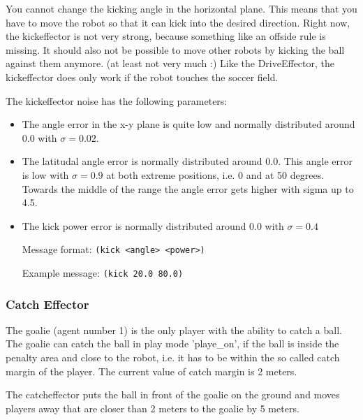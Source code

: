 You cannot change the kicking angle in the horizontal plane. This
means that you have to move the robot so that it can kick into the
desired direction. Right now, the kickeffector is not very strong,
because something like an offside rule is missing. It should also not
be possible to move other robots by kicking the ball against them
anymore. (at least not very much :) Like the DriveEffector, the
kickeffector does only work if the robot touches the soccer field.

The kickeffector noise has the following parameters: 
\begin{itemize}
\item The angle error in the x-y plane is quite low and normally distributed
around $0.0$ with $\sigma = 0.02$.
\item The latitudal angle error is normally distributed around $0.0$. This
angle error is low with $\sigma = 0.9$ at both extreme positions, i.e. 0
and at 50 degrees. Towards the middle of the range the angle error
gets higher with sigma up to 4.5.
\item The kick power error is normally distributed around $0.0$ with $\sigma =
0.4$
\end{itemize}

\begin{itemize}
	\item[Message format:] \texttt{(kick <angle> <power>)}
	\item[Example message:] \texttt{(kick 20.0 80.0)}
\end{itemize}




\subsubsection{Catch Effector}
\label{sec:catcheffector}
The goalie (agent number 1) is the only player with the ability to
catch a ball. The goalie can catch the ball in play mode 'playe\_on',
if the ball is inside the penalty area and close to the robot, i.e. it
has to be within the so called catch margin of the player. The current
value of catch margin is 2 meters.

The catcheffector puts the ball in front of the goalie on the ground
and moves players away that are closer than 2 meters to the goalie by
5 meters.

